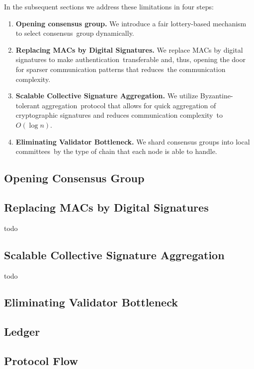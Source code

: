 In the subsequent sections we address these limitations in four steps:
\begin{enumerate}
    \item \textbf{Opening consensus group.} We introduce a fair lottery-based mechanism to select consensus\
    group dynamically.
    \item \textbf{Replacing MACs by Digital Signatures.} We replace MACs by digital signatures to make authentication\
    transferable and, thus, opening the door for sparser communication patterns that reduces\
    the communication complexity.
    \item \textbf{Scalable Collective Signature Aggregation.} We utilize Byzantine-tolerant aggregation\
    protocol that allows for quick aggregation of cryptographic signatures and reduces communication complexity\
    to $O(\log n)$.
    \item \textbf{Eliminating Validator Bottleneck.} We shard consensus groups into local committees\
    by the type of chain that each node is able to handle.
\end{enumerate}

\subsection{Opening Consensus Group}\label{subsec:opening-consensus-group}


\subsection{Replacing MACs by Digital Signatures}\label{subsec:replacing-macs-by-digital-signatures}

todo

\subsection{Scalable Collective Signature Aggregation}\label{subsec:scalable-collective-signature-aggregation}

todo

\subsection{Eliminating Validator Bottleneck}\label{subsec:eliminating-validator-bottleneck}


\subsection{Ledger}\label{subsec:ledger}


\subsection{Protocol Flow}\label{subsec:protocol-flow}

